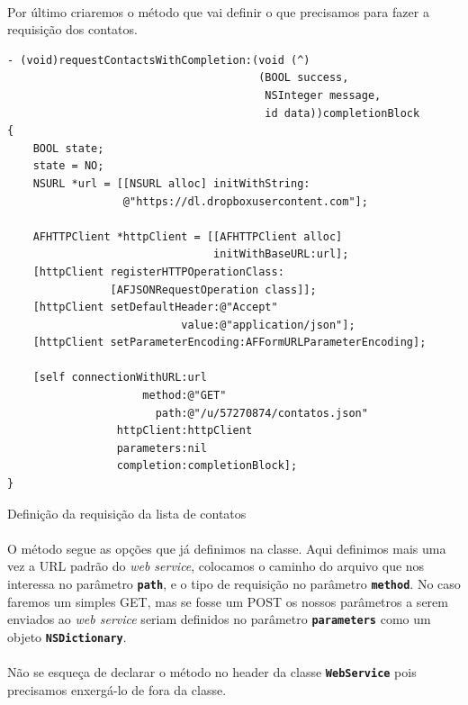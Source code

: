 \documentclass[a4paper,12pt,brazil,doubleside]{book}
\begin{document}
\begin{singlespace}
\paragraph{}Por último criaremos o método que vai definir o que precisamos para fazer a requisição dos contatos.

\begin{listing}[H]
\begin{verbatim}
- (void)requestContactsWithCompletion:(void (^)
                                       (BOOL success,
                                        NSInteger message,
                                        id data))completionBlock
{
    BOOL state;
    state = NO;
    NSURL *url = [[NSURL alloc] initWithString:
                  @"https://dl.dropboxusercontent.com"];
    
    AFHTTPClient *httpClient = [[AFHTTPClient alloc]
                                initWithBaseURL:url];
    [httpClient registerHTTPOperationClass:
                [AFJSONRequestOperation class]];
    [httpClient setDefaultHeader:@"Accept"
                           value:@"application/json"];
    [httpClient setParameterEncoding:AFFormURLParameterEncoding];
    
    [self connectionWithURL:url
                     method:@"GET"
                       path:@"/u/57270874/contatos.json"
                 httpClient:httpClient
                 parameters:nil
                 completion:completionBlock];
}
\end{verbatim}
\caption{Definição da requisição da lista de contatos}
\end{listing}

\paragraph{}O método segue as opções que já definimos na classe. Aqui definimos mais uma vez a URL padrão do \emph{web service}, colocamos o caminho do arquivo que nos interessa no parâmetro \texttt{\textbf{path}}, e o tipo de requisição no parâmetro \texttt{\textbf{method}}. No caso faremos um simples GET, mas se fosse um POST os nossos parâmetros a serem enviados ao \emph{web service} seriam definidos no parâmetro \texttt{\textbf{parameters}} como um objeto  \texttt{\textbf{NSDictionary}}.
\paragraph{}Não se esqueça de declarar o método no header da classe \texttt{\textbf{WebService}} pois precisamos enxergá-lo de fora da classe.


\end{singlespace}
\end{document}

